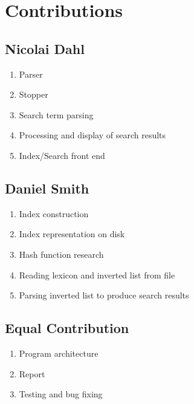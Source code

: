 \appendix
\label{sec:Appendix}

\section{Contributions}
\label{sec:contributions}

\subsection{Nicolai Dahl}
\begin{enumerate}
	\item Parser
	\item Stopper
	\item Search term parsing
	\item Processing and display of search results
	\item Index/Search front end
\end{enumerate}

\subsection{Daniel Smith}
\begin{enumerate}
	\item Index construction
	\item Index representation on disk
	\item Hash function research
	\item Reading lexicon and inverted list from file
	\item Parsing inverted list to produce search results
\end{enumerate}

\subsection{Equal Contribution}
\begin{enumerate}
	\item Program architecture
	\item Report
	\item Testing and bug fixing
\end{enumerate}
